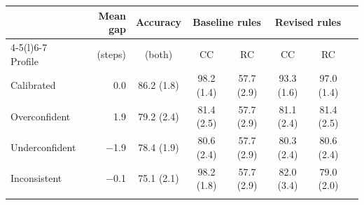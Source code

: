 \footnotesize
\begin{tabular}{@{}lrcccccc@{}}
\toprule
 & Mean gap & Accuracy & \multicolumn{2}{c}{Baseline rules} & \multicolumn{2}{c}{Revised rules}\\
\cmidrule(lr){4-5}\cmidrule(l){6-7}
Profile & (steps) & (both) & CC & RC & CC & RC\\
\midrule
Calibrated & 0.0 & 86.2 (1.8) & 98.2 (1.4) & 57.7 (2.9) & 93.3 (1.6) & 97.0 (1.4)\\
Overconfident & 1.9 & 79.2 (2.4) & 81.4 (2.5) & 57.7 (2.9) & 81.1 (2.4) & 81.4 (2.5)\\
Underconfident & $-$1.9 & 78.4 (1.9) & 80.6 (2.4) & 57.7 (2.9) & 80.3 (2.4) & 80.6 (2.4)\\
Inconsistent & $-$0.1 & 75.1 (2.1) & 98.2 (1.8) & 57.7 (2.9) & 82.0 (3.4) & 79.0 (2.0)\\
\botrule
\end{tabular}

